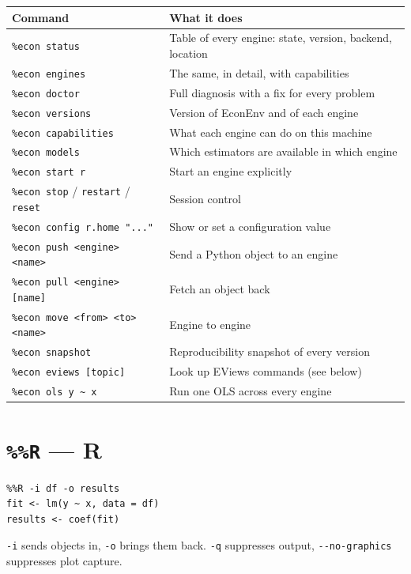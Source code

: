 \documentclass[11pt,a4paper]{report}
\begin{document}
\begin{center}
\begin{longtable}{@{}lp{9.2cm}@{}}
\toprule
\textbf{Command} & \textbf{What it does} \\
\midrule
\endhead
\texttt{\%econ status} & Table of every engine: state, version, backend, location \\
\texttt{\%econ engines} & The same, in detail, with capabilities \\
\texttt{\%econ doctor} & Full diagnosis with a fix for every problem \\
\texttt{\%econ versions} & Version of EconEnv and of each engine \\
\texttt{\%econ capabilities} & What each engine can do on this machine \\
\texttt{\%econ models} & Which estimators are available in which engine \\
\texttt{\%econ start r} & Start an engine explicitly \\
\texttt{\%econ stop} / \texttt{restart} / \texttt{reset} & Session control \\
\texttt{\%econ config r.home "..."} & Show or set a configuration value \\
\texttt{\%econ push <engine> <name>} & Send a Python object to an engine \\
\texttt{\%econ pull <engine> [name]} & Fetch an object back \\
\texttt{\%econ move <from> <to> <name>} & Engine to engine \\
\texttt{\%econ snapshot} & Reproducibility snapshot of every version \\
\texttt{\%econ eviews [topic]} & Look up EViews commands (see below) \\
\texttt{\%econ ols y \textasciitilde{} x} & Run one OLS across every engine \\
\bottomrule
\end{longtable}
\end{center}

\section{\texttt{\%\%R} --- R}

\begin{lstlisting}
%%R -i df -o results
fit <- lm(y ~ x, data = df)
results <- coef(fit)
\end{lstlisting}

\texttt{-i} sends objects in, \texttt{-o} brings them back. \texttt{-q}
suppresses output, \texttt{-{}-no-graphics} suppresses plot capture.
\end{document}
